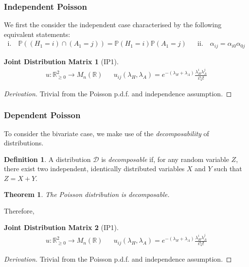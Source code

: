 \documentclass[a4paper,11pt,oneside]{book}
\theoremstyle{plain}
\newtheorem{thm}{Theorem}[section]
\newtheorem*{jdm}{Joint Distribution Matrix}
\theoremstyle{definition}
\newtheorem{defn}{Definition}[section]
\begin{document}
\subsection{Independent Poisson}
We first the consider the independent case characterised by the following equivalent statements:
\begin{align*}
\text{i.} \quad \mathbb{P}((H_1=i)\cap (A_1=j))=\mathbb{P}(H_1=i)\mathbb{P} (A_1=j) && \text{ii.} \quad\alpha_{ij}=\alpha_{i0}\alpha_{0j}
\end{align*}
\begin{jdm}[IP1]
\begin{align*}
u: \mathbb{R}^2_{\ge 0} \rightarrow M_n(\mathbb{R}) && u_{ij}(\lambda_H,\lambda_A)=e^{-(\lambda_H+\lambda_A)}\frac{\lambda_H^i\lambda_A^j}{i!j!}
\end{align*}
\end{jdm}
\begin{proof}[Derivation]
Trivial from the Poisson p.d.f. and independence assumption.
\end{proof}
\subsection{Dependent Poisson }
To consider the bivariate case, we make use of the \emph{decomposability} of distributions.
\begin{defn}
A distribution $\mathcal{D}$ is \emph{decomposable} if, for any random variable $Z$, there exist two independent, identically distributed variables $X$ and $Y$ such that $Z=X+Y$.
\end{defn}
\begin{thm}
The Poisson distribution is decomposable.
\end{thm}
Therefore, 
\begin{jdm}[IP1]
\begin{align*}
u: \mathbb{R}^2_{\ge 0} \rightarrow M_n(\mathbb{R}) && u_{ij}(\lambda_H,\lambda_A)=e^{-(\lambda_H+\lambda_A)}\frac{\lambda_H^i\lambda_A^j}{i!j!}
\end{align*}
\end{jdm}
\begin{proof}[Derivation]
Trivial from the Poisson p.d.f. and independence assumption.
\end{proof}







\chapter{}
\end{document}
